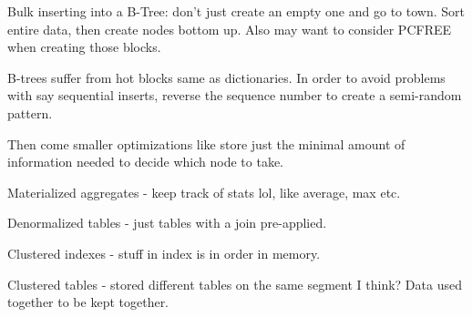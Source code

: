 \documentclass{article}
\begin{document}
		Bulk inserting into a B-Tree: don't just create an empty one and go to town. Sort entire data, then create nodes bottom up. Also may want to consider PCFREE when creating those blocks.
		
		B-trees suffer from hot blocks same as dictionaries. In order to avoid problems with say sequential inserts, reverse the sequence number to create a semi-random pattern.
		
		Then come smaller optimizations like store just the minimal amount of information needed to decide which node to take.
		
		Materialized aggregates - keep track of stats lol, like average, max etc.
		
		Denormalized tables - just tables with a join pre-applied.
		
		Clustered indexes - stuff in index is in order in memory.
		
		Clustered tables - stored different tables on the same segment I think? Data used together to be kept together.
				
		
			
	
		
	
	
		
		
		
		
		
		
\end{document}
